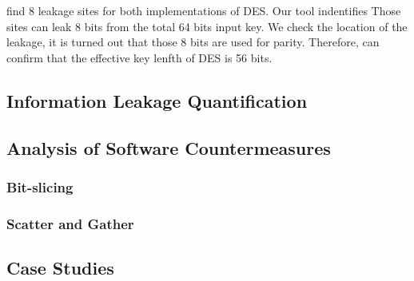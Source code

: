 \tool find 8 leakage sites for both implementations of DES. Our tool
indentifies Those sites can leak 8 bits from the total 64 bits 
input key. We check the location of the leakage, it is turned out that
those 8 bits are used for parity. Therefore, \tool can confirm that 
the effective key lenfth of DES is 56 bits.

\subsection{Information Leakage Quantification}
\subsection{Analysis of Software Countermeasures}
\subsubsection{Bit-slicing}
\subsubsection{Scatter and Gather}
\subsection{Case Studies}

